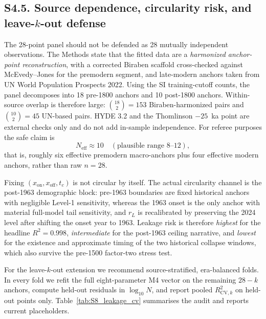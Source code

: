 \documentclass[11pt]{article}
\begin{document}
\subsection*{S4.5. Source dependence, circularity risk, and leave-$k$-out defense}
\label{subsec:S4_5_source_audit}
The 28-point panel should not be defended as 28 mutually independent observations. The Methods state that the fitted data are a \emph{harmonized anchor-point reconstruction}, with a corrected Biraben scaffold cross-checked against McEvedy--Jones for the premodern segment, and late-modern anchors taken from UN World Population Prospects 2022. Using the SI training-cutoff counts, the panel decomposes into 18 pre-1800 anchors and 10 post-1800 anchors. Within-source overlap is therefore large: $\binom{18}{2}=153$ Biraben-harmonized pairs and $\binom{10}{2}=45$ UN-based pairs. HYDE 3.2 and the Thomlinson $-25$~ka point are external checks only and do not add in-sample independence. For referee purposes the safe claim is
\[
N_{\mathrm{eff}}\approx 10 \quad (\text{plausible range } 8\text{--}12),
\]
that is, roughly six effective premodern macro-anchors plus four effective modern anchors, rather than raw $n=28$.

Fixing $(x_{\mathrm{on}},x_{\mathrm{off}},t_c)$ is not circular by itself. The actual circularity channel is the post-1963 demographic block: pre-1963 boundaries are fixed historical anchors with negligible Level-1 sensitivity, whereas the 1963 onset is the only anchor with material full-model tail sensitivity, and $r_L$ is recalibrated by preserving the 2024 level after shifting the onset year to 1963. Leakage risk is therefore \emph{highest} for the headline $R^2=0.998$, \emph{intermediate} for the post-1963 ceiling narrative, and \emph{lowest} for the existence and approximate timing of the two historical collapse windows, which also survive the pre-1500 factor-two stress test.

For the leave-$k$-out extension we recommend source-stratified, era-balanced folds. In every fold we refit the full eight-parameter M4 vector on the remaining $28-k$ anchors, compute held-out residuals in $\log_{10}N$, and report pooled $R^2_{\mathrm{CV},k}$ on held-out points only. Table~\ref{tab:S8_leakage_cv} summarises the audit and reports current placeholders.
\end{document}
